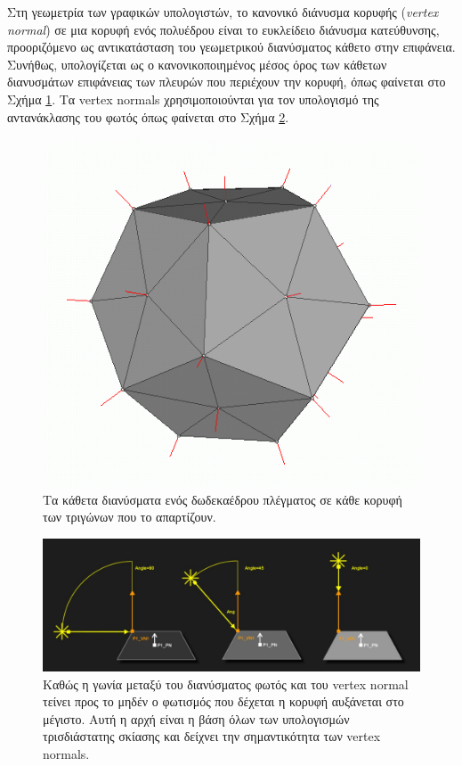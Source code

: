 Στη γεωμετρία των γραφικών υπολογιστών, το κανονικό διάνυσμα κορυφής (\textsl{vertex normal}) σε μια κορυφή ενός πολυέδρου είναι το ευκλείδειο διάνυσμα κατεύθυνσης, προοριζόμενο ως αντικατάσταση του γεωμετρικού διανύσματος κάθετο στην επιφάνεια. Συνήθως, υπολογίζεται ως ο κανονικοποιημένος μέσος όρος των κάθετων διανυσμάτων επιφάνειας των πλευρών που περιέχουν την κορυφή, όπως φαίνεται στο Σχήμα \ref{fig:vertex_normal}. Τα vertex normals χρησιμοποιούνται για τον υπολογισμό της αντανάκλασης του φωτός όπως φαίνεται στο Σχήμα \ref{fig:vertex_normal_reflection}.

\begin{figure}[h]	
	\centering
	\includegraphics[scale=0.5]{images/appendix/vertex_normal.png}
	\caption[Κάθετα διανύσματα κορυφών πολύεδρου]{Τα κάθετα διανύσματα ενός δωδεκαέδρου πλέγματος σε κάθε κορυφή των τριγώνων που το απαρτίζουν.}
	\label{fig:vertex_normal}
\end{figure}

\begin{figure}[h]	
	\centering
	\includegraphics[scale=0.7]{images/appendix/vertex_normal_reflection.jpg}
	\caption[Αντανάκλαση του φωτός στο κάθετο διάνυσμα]{Καθώς η γωνία μεταξύ του διανύσματος φωτός και του vertex normal τείνει προς το μηδέν ο φωτισμός που δέχεται η κορυφή αυξάνεται στο μέγιστο. Αυτή η αρχή είναι η βάση όλων των υπολογισμών τρισδιάστατης σκίασης και δείχνει την σημαντικότητα των vertex normals.}
	\label{fig:vertex_normal_reflection}
\end{figure}
